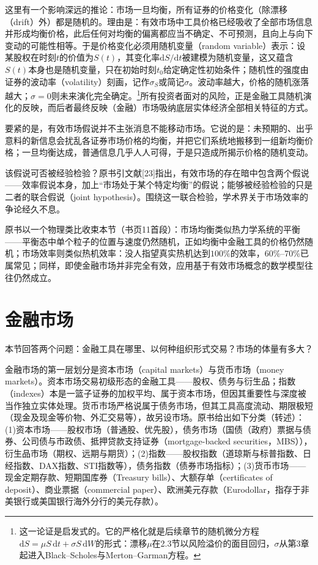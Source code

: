 这里有一个影响深远的推论：市场一旦均衡，所有证券的价格变化（除漂移（drift）外）都是随机的。理由是：有效市场中工具价格已经吸收了全部市场信息并形成均衡价格，此后任何对均衡的偏离都应当不确定、不可预测，且向上与向下变动的可能性相等。于是价格变化必须用随机变量（random variable）表示：设某股权在时刻$t$的价值为$S(t)$，其变化率$\mathrm{d}S/\mathrm{d}t$被建模为随机变量，这又蕴含$S(t)$本身也是随机变量，只在初始时刻$t_0$给定确定性初始条件；随机性的强度由证券的波动率（volatility）刻画，记作$\sigma_S$或简记$\sigma$。波动率越大，价格的随机涨落越大；$\sigma=0$则未来演化完全确定。\footnote{这一论证是启发式的。它的严格化就是后续章节的随机微分方程$\mathrm{d}S=\mu S\,\mathrm{d}t+\sigma S\,\mathrm{d}W$的形式：漂移$\mu$在2.3节以风险溢价的面目回归，$\sigma$从第3章起进入Black--Scholes与Merton--Garman方程。}所有投资者面对的风险，正是金融工具随机演化的反映，而后者最终反映（金融）市场吸纳底层实体经济全部相关特征的方式。

要紧的是，有效市场假说并不主张消息不能移动市场。它说的是：未预期的、出乎意料的新信息会扰乱各证券市场价格的均衡，并把它们系统地搬移到一组新均衡价格；一旦均衡达成，普通信息几乎人人可得，于是只造成所揭示价格的随机变动。

该假说可否被经验检验？原书引文献[23]指出，有效市场的存在暗中包含两个假说——效率假说本身，加上“市场处于某个特定均衡”的假说；能够被经验检验的只是二者的联合假说（joint hypothesis）。围绕这一联合检验，学术界关于市场效率的争论经久不息。

原书以一个物理类比收束本节（书页11首段）：市场均衡类似热力学系统的平衡——平衡态中单个粒子的位置与速度仍然随机，正如均衡中金融工具的价格仍然随机；市场效率则类似热机效率：没人指望真实热机达到$100\%$的效率，$60\%$--$70\%$已属常见；同样，即使金融市场并非完全有效，应用基于有效市场概念的数学模型往往仍然成立。

\section{金融市场}

本节回答两个问题：金融工具在哪里、以何种组织形式交易？市场的体量有多大？

金融市场的第一层划分是资本市场（capital markets）与货币市场（money markets）。资本市场交易初级形态的金融工具——股权、债务与衍生品；指数（indexes）本是一篮子证券的加权平均、属于资本市场，但因其重要性与深度被当作独立实体处理。货币市场严格说属于债务市场，但其工具高度流动、期限极短（现金及现金等价物、外汇交易等），故另设市场。原书给出如下分类（转述）：(1)资本市场——股权市场（普通股、优先股），债务市场（国债（政府）票据与债券、公司债与市政债、抵押贷款支持证券（mortgage-backed securities，MBS）），衍生品市场（期权、远期与期货）；(2)指数——股权指数（道琼斯与标普指数、日经指数、DAX指数、STI指数等），债务指数（债券市场指标）；(3)货币市场——现金定期存款、短期国库券（Treasury bills）、大额存单（certificates of deposit）、商业票据（commercial paper）、欧洲美元存款（Eurodollar，指存于非美银行或美国银行海外分行的美元存款）。

